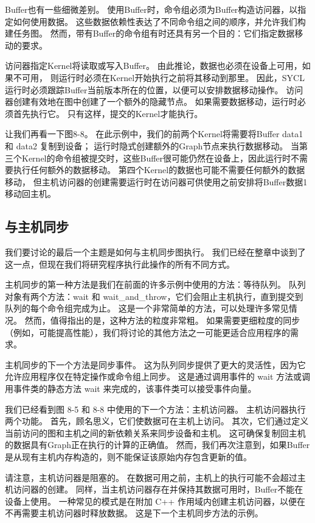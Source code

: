 Buffer也有一些细微差别。 使用Buffer时，命令组必须为Buffer构造访问器，以指定如何使用数据。 
这些数据依赖性表达了不同命令组之间的顺序，并允许我们构建任务图。 
然而，带有Buffer的命令组有时还具有另一个目的：它们指定数据移动的要求。

访问器指定Kernel将读取或写入Buffer。 由此推论，数据也必须在设备上可用，如果不可用，
则运行时必须在Kernel开始执行之前将其移动到那里。 
因此，SYCL 运行时必须跟踪Buffer当前版本所在的位置，以便可以安排数据移动操作。 
访问器创建有效地在图中创建了一个额外的隐藏节点。 如果需要数据移动，运行时必须首先执行它。 
只有这样，提交的Kernel才能执行。

让我们再看一下图8-8。 在此示例中，我们的前两个Kernel将需要将Buffer data1 和 data2 复制到设备； 
运行时隐式创建额外的Graph节点来执行数据移动。 
当第三个Kernel的命令组被提交时，这些Buffer很可能仍然在设备上，因此运行时不需要执行任何额外的数据移动。 
第四个Kernel的数据也可能不需要任何额外的数据移动，
但主机访问器的创建需要运行时在访问器可供使用之前安排将Buffer数据1移动回主机。

\subsection{与主机同步}
我们要讨论的最后一个主题是如何与主机同步图执行。 
我们已经在整章中谈到了这一点，但现在我们将研究程序执行此操作的所有不同方式。

主机同步的第一种方法是我们在前面的许多示例中使用的方法：等待队列。 
队列对象有两个方法：wait 和 wait\_and\_throw，它们会阻止主机执行，直到提交到队列的每个命令组完成为止。 
这是一个非常简单的方法，可以处理许多常见情况。 然而，值得指出的是，这种方法的粒度非常粗。 
如果需要更细粒度的同步（例如，可能提高性能），我们将讨论的其他方法之一可能更适合应用程序的需求。

主机同步的下一个方法是同步事件。 这为队列同步提供了更大的灵活性，因为它允许应用程序仅在特定操作或命令组上同步。 
这是通过调用事件的 wait 方法或调用事件类的静态方法 wait 来完成的，该事件类可以接受事件向量。

我们已经看到图 8-5 和 8-8 中使用的下一个方法：主机访问器。 主机访问器执行两个功能。 
首先，顾名思义，它们使数据可在主机上访问。 其次，它们通过定义当前访问的图和主机之间的新依赖关系来同步设备和主机。 
这可确保复制回主机的数据具有Graph正在执行的计算的正确值。 
然而，我们再次注意到，如果Buffer是从现有主机内存构造的，则不能保证该原始内存包含更新的值。

请注意，主机访问器是阻塞的。 在数据可用之前，主机上的执行可能不会超过主机访问器的创建。 
同样，当主机访问器存在并保持其数据可用时，Buffer不能在设备上使用。 
一种常见的模式是在附加 C++ 作用域内创建主机访问器，以便在不再需要主机访问器时释放数据。 
这是下一个主机同步方法的示例。

